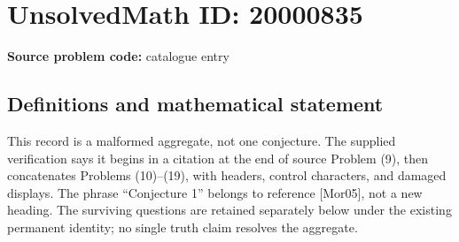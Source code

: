 \documentclass[11pt]{article}
\begin{document}
\section*{UnsolvedMath ID: 20000835}
\textbf{Source problem code:} catalogue entry
\subsection{Definitions and mathematical statement}
This record is a malformed aggregate, not one conjecture. The supplied verification says it begins in a citation at the end of source Problem (9), then concatenates Problems (10)--(19), with headers, control characters, and damaged displays. The phrase ``Conjecture 1'' belongs to reference [Mor05], not a new heading. The surviving questions are retained separately below under the existing permanent identity; no single truth claim resolves the aggregate.
\end{document}
